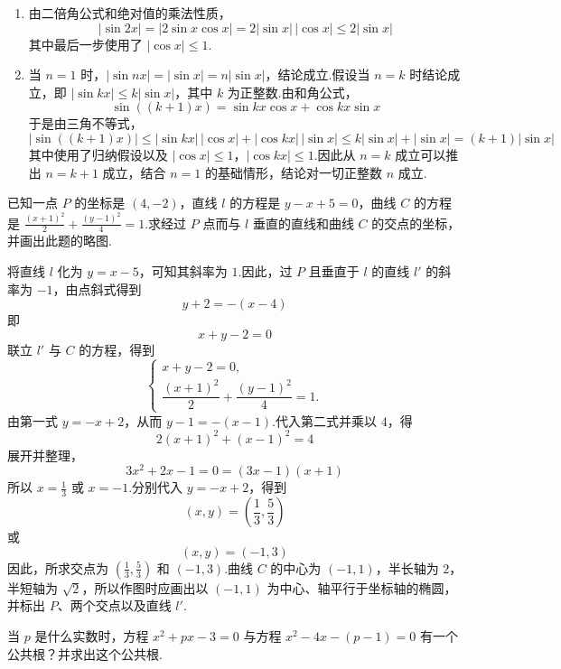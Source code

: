 \begin{solution}
\begin{enumerate}
\item 由二倍角公式和绝对值的乘法性质，
\[
|\sin2x|=|2\sin x\cos x|=2|\sin x|\,|\cos x|\leq2|\sin x|
\]
其中最后一步使用了 \( |\cos x|\leq1 \).

\item 当 \(n=1\) 时，\( |\sin nx|=|\sin x|=n|\sin x| \)，结论成立.假设当 \(n=k\) 时结论成立，即 \( |\sin kx|\leq k|\sin x| \)，其中 \(k\) 为正整数.由和角公式，
\[
\sin((k+1)x)=\sin kx\cos x+\cos kx\sin x
\]
于是由三角不等式，
\[
|\sin((k+1)x)|\leq|\sin kx|\,|\cos x|+|\cos kx|\,|\sin x|\leq k|\sin x|+|\sin x|=(k+1)|\sin x|
\]
其中使用了归纳假设以及 \( |\cos x|\leq1 \)，\( |\cos kx|\leq1 \).因此从 \(n=k\) 成立可以推出 \(n=k+1\) 成立，结合 \(n=1\) 的基础情形，结论对一切正整数 \(n\) 成立.
\end{enumerate}
\end{solution}

\begin{problem}
已知一点 \(P\) 的坐标是 \( (4,-2) \)，直线 \(l\) 的方程是 \(y-x+5=0\)，曲线 \(C\) 的方程是 \(\frac{(x+1)^2}{2}+\frac{(y-1)^2}{4}=1\).求经过 \(P\) 点而与 \(l\) 垂直的直线和曲线 \(C\) 的交点的坐标，并画出此题的略图.
\end{problem}

\begin{solution}
将直线 \(l\) 化为 \(y=x-5\)，可知其斜率为 \(1\).因此，过 \(P\) 且垂直于 \(l\) 的直线 \(l'\) 的斜率为 \(-1\)，由点斜式得到
\[
y+2=-(x-4)
\]
即
\[
x+y-2=0
\]
联立 \(l'\) 与 \(C\) 的方程，得到
\[
\begin{cases}
x+y-2=0,\\
\dfrac{(x+1)^2}{2}+\dfrac{(y-1)^2}{4}=1.
\end{cases}
\]
由第一式 \(y=-x+2\)，从而 \(y-1=-(x-1)\).代入第二式并乘以 \(4\)，得
\[
2(x+1)^2+(x-1)^2=4
\]
展开并整理，
\[
3x^2+2x-1=0=(3x-1)(x+1)
\]
所以 \(x=\frac13\) 或 \(x=-1\).分别代入 \(y=-x+2\)，得到
\[
\left(x,y\right)=\left(\frac13,\frac53\right)
\]
或
\[
\left(x,y\right)=(-1,3)
\]
因此，所求交点为 \(\left(\frac13,\frac53\right)\) 和 \((-1,3)\).曲线 \(C\) 的中心为 \((-1,1)\)，半长轴为 \(2\)，半短轴为 \(\sqrt2\)，所以作图时应画出以 \((-1,1)\) 为中心、轴平行于坐标轴的椭圆，并标出 \(P\)、两个交点以及直线 \(l'\).

\end{solution}

\begin{problem}
当 \(p\) 是什么实数时，方程 \(x^2+px-3=0\) 与方程 \(x^2-4x-(p-1)=0\) 有一个公共根？并求出这个公共根.
\end{problem}

